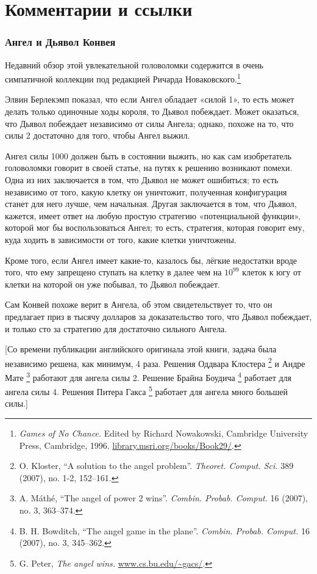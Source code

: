 \section*{Комментарии и ссылки}

\subsubsection*{Ангел и Дьявол Конвея}

Недавний обзор этой увлекательной головоломки содержится в очень симпатичной коллекции под редакцией Ричарда Новаковского.\footnote{\emph{Games of No Chance.} Edited by Richard Nowakowski, Cambridge University Press, Cambridge, 1996. \href{http://library.msri.org/books/Book29/}{\url{library.msri.org/books/Book29/}}.} 

Элвин Берлекэмп показал, что если Ангел обладает «силой 1», то есть может делать только одиночные ходы короля, то Дьявол побеждает.
Может оказаться, что Дьявол побеждает независимо от силы Ангела; 
однако, похоже на то, что силы 2 достаточно для того, чтобы Ангел выжил.

Ангел силы 1000 должен быть в состоянии выжить, но как сам изобретатель головоломки говорит в своей статье, на путях к решению возникают помехи.
Одна из них заключается в том, что Дьявол не может ошибиться;
то есть независимо от того, какую клетку он уничтожит, полученная конфигурация станет для него лучше, чем начальная.
Другая заключается в том, что Дьявол, кажется, имеет ответ на любую простую стратегию «потенциальной функции», которой мог бы воспользоваться Ангел;
то есть, стратегия, которая говорит ему, куда ходить в зависимости от того, какие клетки уничтожены. 

Кроме того, если Ангел имеет какие-то, казалось бы, лёгкие недостатки вроде того, что ему запрещено ступать на клетку в далее чем на $10^{99}$ клеток к югу от клетки на которой он уже побывал, то Дьявол побеждает.

Сам Конвей похоже верит в Ангела, об этом свидетельствует то, что он предлагает приз в тысячу долларов за доказательство того, что Дьявол побеждает, и только сто за стратегию для достаточно сильного Ангела.

[Со времени публикации английского оригинала этой книги, задача была независимо решена, как минимум, 4 раза.
Решения Оддвара Клостера%
\footnote{
O. Kloster, 
``A solution to the angel problem''.
\emph{Theoret. Comput. Sci.} 389 (2007), no. 1-2, 152--161.}
и Андре Мате%
\footnote{
A. Máthé, 
``The angel of power 2 wins''. 
\emph{Combin. Probab. Comput.} 16 (2007), no. 3, 363–374.}
работают для ангела силы 2.
Решение Брайна Боудича%
\footnote{B. H. Bowditch, ``The angel game in the plane''. \emph{Combin. Probab. Comput.} 16 (2007), no. 3, 345--362.}
работает для ангела силы 4.
Решения Питера Гакса%
\footnote{G. Peter, \emph{The angel wins.} \href{https://www.cs.bu.edu/~gacs/papers/angel.pdf}{\url{www.cs.bu.edu/~gacs/}}.}
работает для ангела много большей силы.]

